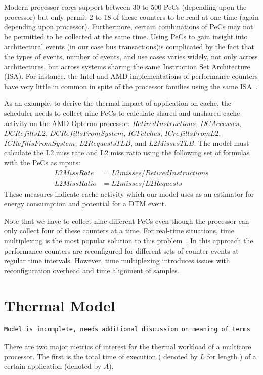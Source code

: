\documentclass[times,12pt,onecolumn]{article}
\begin{document}
Modern processor cores support between 30 to 500 PeCs (depending upon
the processor) but only permit 2 to 18 of these counters to be read at
one time (again depending upon processor).  Furthermore, certain
combinations of PeCs may not be permitted to be collected at the same
time. Using PeCs to gain insight into architectural events (in our case
bus transactions)is complicated by the fact that the types of events,
number of events, and use cases varies widely, not only across
architectures, but across systems sharing the same Instruction Set
Architecture (ISA).  For instance, the Intel and AMD implementations of
performance counters have very little in common in spite of the
processor families using the same ISA~\cite{Singhal2008}\cite{AMD2008}.

As an example, to derive the thermal impact of application on cache, the
scheduler needs to collect nine PeCs to calculate shared and unshared
cache activity on the AMD Opteron processor: $RetiredInstructions$,
$DCAccesses$, $DCRefillsL2$, $DCRefillsFromSystem$, $ICFetches$,
$ICrefillsFromL2$, $ICRefillsFromSystem$, $L2RequestsTLB$, and
$L2MissesTLB$.  The model must calculate the L2 miss rate and L2 miss
ratio using the following set of formulas with the PeCs as inputs:
\begin{align}
  L2MissRate &= L2misses / RetiredInstructions\nonumber\\
  L2MissRatio & = L2misses / L2Requests\nonumber
\end{align}
These measures indicate cache activity which our model uses as an estimator
for energy consumption and potential for a DTM event.

Note that we have to collect nine different PeCs even though the
processor can only collect four of these counters at a time.  For
real-time situations, time multiplexing is the most popular solution to
this problem~\cite{Azimi2005}. In this approach the performance
counters are reconfigured for different sets of counter events at
regular time intervals.  However, time multiplexing introduces issues
with reconfiguration overhead and time alignment of samples.
\section{Thermal Model}
\label{sec:thermal}
\begin{verbatim}
Model is incomplete, needs additional discussion on meaning of terms
\end{verbatim}
There are two major metrics of interest for the thermal workload of a
multicore processor. The first is the total time of execution ( denoted
by $L$ for length ) of a certain application (denoted by $A$),
\end{document}
